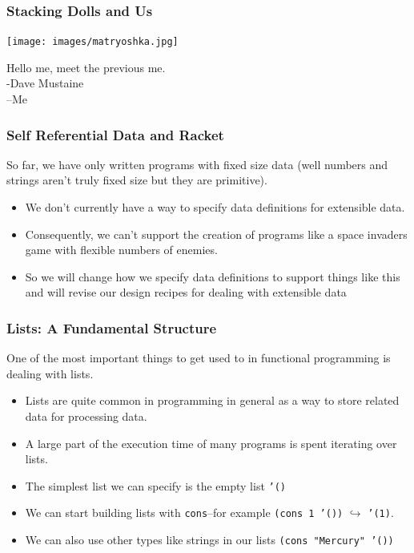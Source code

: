 \documentclass{beamer}
\begin{document}
\begin{frame}
  \frametitle{Stacking Dolls and Us}
  \begin{center}
    \texttt{[image: images/matryoshka.jpg]}
  \end{center}
  Hello me, meet the previous me.\\
  -Dave Mustaine\\
  --Me
\end{frame}

\begin{frame}
  \frametitle{Self Referential Data and Racket}
  So far, we have only written programs with fixed size data (well numbers and strings aren't truly fixed size but they are primitive).
  \begin{itemize}
  \item<2-> We don't currently have a way to specify data definitions for extensible data.
  \item<3-> Consequently, we can't support the creation of programs like a space invaders game with
    flexible numbers of enemies.
  \item<4-> So we will change how we specify data definitions to support things like this and will revise our design recipes
    for dealing with extensible data
  \end{itemize}
\end{frame}

\begin{frame}
  \frametitle{Lists: A Fundamental Structure }
  One of the most important things to get used to in functional programming is dealing with lists.
  \begin{itemize}
  \item<2-> Lists are quite common in programming in general as a way to store related data for processing data.
  \item<3-> A large part of the execution time of many programs is spent iterating over lists.
  \item<4-> The simplest list we can specify is the empty list \texttt{'()}
  \item<5-> We can start building lists with \texttt{cons}--for example
    \texttt{(cons 1 '())} $\hookrightarrow$ \texttt{'(1)}.
  \item<6-> We can also use other types like strings in our lists \texttt{(cons "Mercury" '())}
  \end{itemize}
\end{frame}
\end{document}
